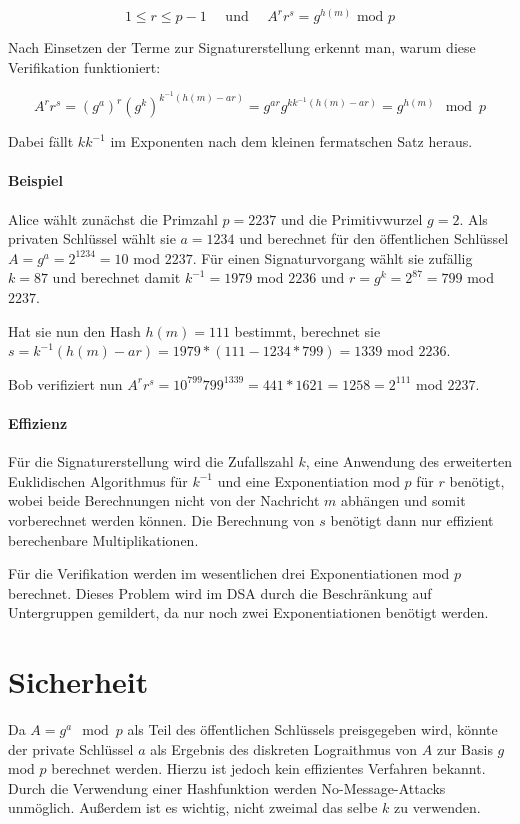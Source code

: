 \documentclass[a4paper,12pt,oneside]{scrreprt}
\begin{document}
\[ 1 \leq r \leq p-1 \text{~~~~und~~~~} A^r r^s = g^{h(m)} \text{ mod } p\]

Nach Einsetzen der Terme zur Signaturerstellung erkennt man, warum diese Verifikation funktioniert:

\[A^r r^s = (g^a)^r (g^k)^{k^{-1} (h(m)-ar)} = g^{ar} g^{k k^{-1} (h(m)-ar)} = g^{h(m)} \mod p \]

Dabei fällt $k k^{-1}$ im Exponenten nach dem kleinen fermatschen Satz heraus. 

\paragraph{Beispiel}

Alice wählt zunächst die Primzahl $p = 2237$ und die Primitivwurzel $g = 2$. Als privaten Schlüssel wählt sie $a = 1234$ und berechnet für den öffentlichen Schlüssel $A = g^a = 2^{1234} = 10$ mod $2237$. Für einen Signaturvorgang wählt sie zufällig $k = 87$ und berechnet damit $k^{-1} = 1979$ mod $2236$ und $r = g^k = 2^{87} = 799$ mod $2237$.

Hat sie nun den Hash $h(m) = 111$ bestimmt, berechnet sie $s = k^{-1}(h(m)-ar) = 1979*(111-1234*799) = 1339$ mod $2236$. 

Bob verifiziert nun $A^r r^s = 10^{799} 799^{1339} = 441 * 1621 = 1258 = 2^{111}$ mod $2237$. 

\paragraph{Effizienz}

Für die Signaturerstellung wird die Zufallszahl $k$, eine Anwendung des erweiterten Euklidischen Algorithmus für $k^{-1}$ und eine Exponentiation mod $p$ für $r$ benötigt, wobei beide Berechnungen nicht von der Nachricht $m$ abhängen und somit vorberechnet werden können. Die Berechnung von $s$ benötigt dann nur effizient berechenbare Multiplikationen. 

Für die Verifikation werden im wesentlichen drei Exponentiationen mod $p$ berechnet. Dieses Problem wird im DSA durch die Beschränkung auf Untergruppen gemildert, da nur noch zwei Exponentiationen benötigt werden. 

\section{Sicherheit}

Da $A = g^a \mod p$ als Teil des öffentlichen Schlüssels preisgegeben wird, könnte der private Schlüssel $a$ als Ergebnis des diskreten Lograithmus von $A$ zur Basis $g$ mod $p$ berechnet werden. Hierzu ist jedoch kein effizientes Verfahren bekannt. Durch die Verwendung einer Hashfunktion werden No-Message-Attacks unmöglich. Außerdem ist es wichtig, nicht zweimal das selbe $k$ zu verwenden. 
\end{document}
